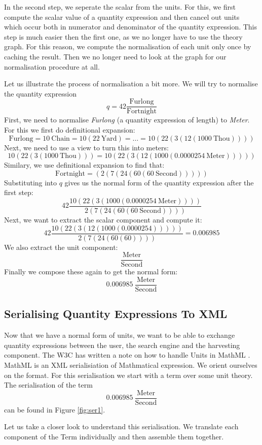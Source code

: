 In the second step, we seperate the scalar from the units. For this, we first compute the scalar value of a quantity expression and then cancel out units which occur both in numerator and denominator of the quantity expression. This step is much easier then the first one, as we no longer have to use the theory graph. For this reason, we compute the normalisation of each unit only once by caching the result. Then we no longer need to look at the graph for our normalisation procedure at all.

Let us illustrate the process of normalisation a bit more. We will try to normalise the quantity expression
\[q = 42 \frac{\text{Furlong}}{\text{Fortnight}}\]
First, we need to normalise \textit{Furlong} (a quantity expression of length) to \textit{Meter}. For this we first do definitional expansion:
\[\text{Furlong} = 10\ \text{Chain} = 10 \left( 22\ \text{Yard}\right) = \dots = 10 \left( 22 \left( 3 \left( 12 \left( 1000\ \text{Thou} \right) \right) \right)\right) \]
Next, we need to use a view to turn this into meters:
\[10 \left( 22 \left( 3 \left( 1000\ \text{Thou} \right) \right)\right) = 10 \left( 22 \left( 3 \left( 12 \left( 1000 \left( 0.0000254\ \text{Meter} \right) \right) \right) \right)\right)\]
Similary, we use definitional expansion to find that:
\[\text{Fortnight} = \left( 2 \left( 7 \left( 24 \left( 60 \left( 60\ \text{Second} \right) \right) \right) \right) \right) \]
Substituting into $q$ gives us the normal form of the quantity expression after the first step:
\[42 \frac{10 \left( 22 \left( 3 \left( 1000 \left( 0.0000254\ \text{Meter} \right) \right) \right)\right)}{ 2 \left( 7 \left( 24 \left( 60 \left( 60\ \text{Second} \right) \right) \right) \right)}\]
Next, we want to extract the scalar component and compute it:
\[42 \frac{10 \left( 22 \left( 3 \left( 12 \left( 1000 \left( 0.0000254 \right) \right) \right) \right)\right)}{ 2 \left( 7 \left( 24 \left( 60 \left( 60\right) \right) \right) \right)} = 0.006985 \]
We also extract the unit component:
\[\frac{\text{Meter}}{\text{Second}}\]
Finally we compose these again to get the normal form:
\[0.006985\ \frac{\text{Meter}}{\text{Second}}\]

\subsection{Serialising Quantity Expressions To XML}
\label{sec:xml}

Now that we have a normal form of units, we want to be able to exchange quantity expressions between the user, the search engine and the harvesting component. The W3C has written a note on how to handle Units in MathML \cite{W3C:Unitnnote}. MathML is an XML serialisiation of Mathmatical expression. We orient ourselves on the format. For this serialisation we start with a term over some unit theory. The serialisation of the term
\[0.006985\ \frac{\text{Meter}}{\text{Second}}\]
can be found in Figure \ref{fig:ser1}.

Let us take a closer look to understand this serialisation. We translate each component of the Term individually and then assemble them together.

